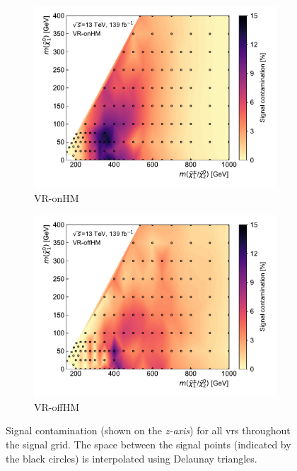 \begin{figure}[H]
	\par\medskip
	\begin{subfigure}[b]{0.5\linewidth}
		\centering\includegraphics[width=1.0\textwidth]{signal_contamination/plot_VR_onHM}
		\caption{VR-onHM\label{fig:signal_contaminations_VRon3}}
	\end{subfigure}\hfill
	\begin{subfigure}[b]{0.5\linewidth}
		\centering\includegraphics[width=1.0\textwidth]{signal_contamination/plot_VR_offHM}
		\caption{VR-offHM\label{fig:signal_contaminations_VRoff3}}
	\end{subfigure}\hfill

	\caption{Signal contamination (shown on the \textit{z-axis}) for all \glspl{vr} throughout the signal grid. The space between the signal points (indicated by the black circles) is interpolated using Delaunay triangles.}
	\label{fig:signal_contaminations_VRs}
\end{figure}



